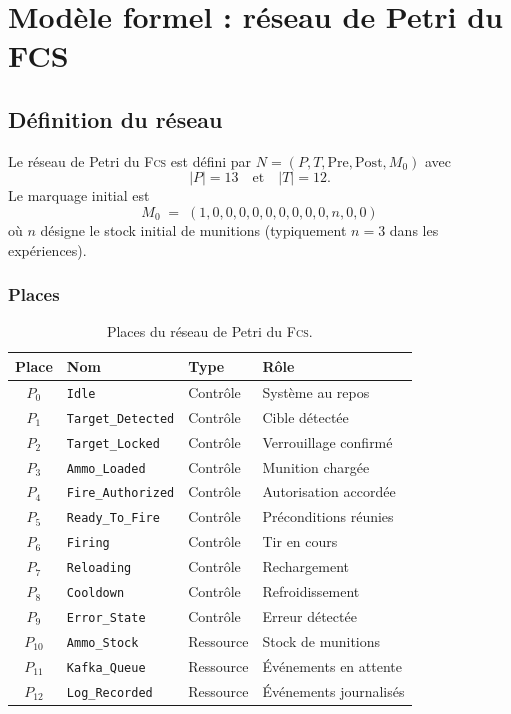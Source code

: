\documentclass[11pt,a4paper]{article}
\newcommand{\fcs}{\textsc{Fcs}\xspace}
\newcommand{\code}[1]{\texttt{#1}}
\begin{document}
\section{Modèle formel : réseau de Petri du FCS}

\subsection{Définition du réseau}

Le réseau de Petri du \fcs est défini par
$N = (P, T, \mathrm{Pre}, \mathrm{Post}, M_0)$ avec
\[
|P| = 13 \quad\text{et}\quad |T| = 12.
\]
Le marquage initial est
\[
M_0 \;=\; (1, 0, 0, 0, 0, 0, 0, 0, 0, 0, n, 0, 0)
\]
où $n$ désigne le stock initial de munitions (typiquement $n = 3$ dans les
expériences).

\subsubsection{Places}

\begin{table}[H]
\centering\small
\begin{tabular}{c l l l}
\toprule
\rowcolor{tableheader}\textbf{Place} & \textbf{Nom} & \textbf{Type} & \textbf{Rôle} \\
\midrule
$P_0$  & \code{Idle}            & Contrôle  & Système au repos \\
$P_1$  & \code{Target\_Detected}& Contrôle  & Cible détectée \\
$P_2$  & \code{Target\_Locked}  & Contrôle  & Verrouillage confirmé \\
$P_3$  & \code{Ammo\_Loaded}    & Contrôle  & Munition chargée \\
$P_4$  & \code{Fire\_Authorized}& Contrôle  & Autorisation accordée \\
$P_5$  & \code{Ready\_To\_Fire} & Contrôle  & Préconditions réunies \\
$P_6$  & \code{Firing}          & Contrôle  & Tir en cours \\
$P_7$  & \code{Reloading}       & Contrôle  & Rechargement \\
$P_8$  & \code{Cooldown}        & Contrôle  & Refroidissement \\
$P_9$  & \code{Error\_State}    & Contrôle  & Erreur détectée \\
$P_{10}$ & \code{Ammo\_Stock}   & Ressource & Stock de munitions \\
$P_{11}$ & \code{Kafka\_Queue}  & Ressource & Événements en attente \\
$P_{12}$ & \code{Log\_Recorded} & Ressource & Événements journalisés \\
\bottomrule
\end{tabular}
\caption{Places du réseau de Petri du \fcs.}
\end{table}
\end{document}
